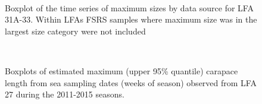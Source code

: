 \documentclass[11pt]{article}
\newcommand{\e}{/backup/bio_data/bio.lobster/figures/} %
\begin{document}
\begin{figure}
        \centering
         \\
                     \caption{Boxplot of the time series of maximum sizes by data source for LFA 31A-33. Within LFAs FSRS samples where maximum size was in the largest size category were not included}
        \end{figure}

\begin{figure}
        \centering
         \\
                     \caption{Boxplots of estimated maximum (upper 95\% quantile) carapace length from sea sampling dates (weeks of season) observed from LFA 27 during the 2011-2015 seasons. }
        \end{figure}
\end{document}

